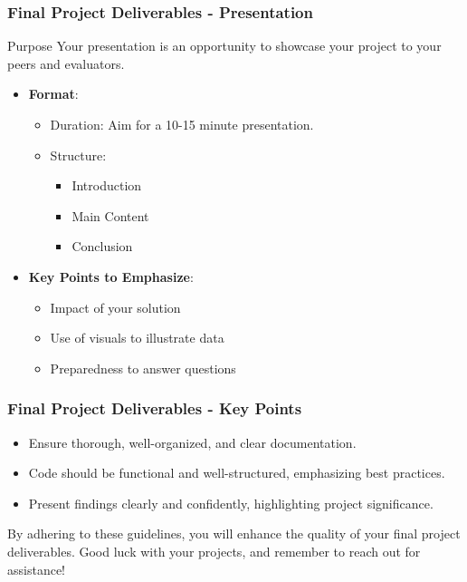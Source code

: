 \documentclass[aspectratio=169]{beamer}
\begin{document}
\begin{frame}[fragile]
    \frametitle{Final Project Deliverables - Presentation}
    \begin{block}{Purpose}
        Your presentation is an opportunity to showcase your project to your peers and evaluators.
    \end{block}
    \begin{itemize}
        \item \textbf{Format}:
        \begin{itemize}
            \item Duration: Aim for a 10-15 minute presentation.
            \item Structure:
            \begin{itemize}
                \item Introduction
                \item Main Content
                \item Conclusion
            \end{itemize}
        \end{itemize}
        \item \textbf{Key Points to Emphasize}:
        \begin{itemize}
            \item Impact of your solution
            \item Use of visuals to illustrate data
            \item Preparedness to answer questions
        \end{itemize}
    \end{itemize}
\end{frame}

\begin{frame}[fragile]
    \frametitle{Final Project Deliverables - Key Points}
    \begin{itemize}
        \item Ensure thorough, well-organized, and clear documentation.
        \item Code should be functional and well-structured, emphasizing best practices.
        \item Present findings clearly and confidently, highlighting project significance.
    \end{itemize}
    By adhering to these guidelines, you will enhance the quality of your final project deliverables.
    Good luck with your projects, and remember to reach out for assistance!
\end{frame}
\end{document}
